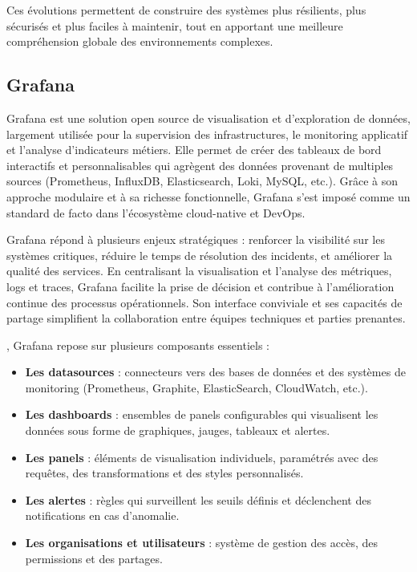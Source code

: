 Ces évolutions permettent de construire des systèmes plus résilients, plus sécurisés et plus faciles à maintenir, tout en apportant une meilleure compréhension globale des environnements complexes.

\subsection{Grafana}

Grafana est une solution open source de visualisation et d’exploration de données, largement utilisée pour la supervision des infrastructures, le monitoring applicatif et l’analyse d’indicateurs métiers. Elle permet de créer des tableaux de bord interactifs et personnalisables qui agrègent des données provenant de multiples sources (Prometheus, InfluxDB, Elasticsearch, Loki, MySQL, etc.). Grâce à son approche modulaire et à sa richesse fonctionnelle, Grafana s’est imposé comme un standard de facto dans l’écosystème cloud-native et DevOps.

Grafana répond à plusieurs enjeux stratégiques  : renforcer la visibilité sur les systèmes critiques, réduire le temps de résolution des incidents, et améliorer la qualité des services. En centralisant la visualisation et l’analyse des métriques, logs et traces, Grafana facilite la prise de décision et contribue à l’amélioration continue des processus opérationnels. Son interface conviviale et ses capacités de partage simplifient la collaboration entre équipes techniques et parties prenantes.

, Grafana repose sur plusieurs composants essentiels  :
\begin{itemize}
	\item \textbf{Les datasources}  : connecteurs vers des bases de données et des systèmes de monitoring (Prometheus, Graphite, ElasticSearch, CloudWatch, etc.).
	\item \textbf{Les dashboards}  : ensembles de panels configurables qui visualisent les données sous forme de graphiques, jauges, tableaux et alertes.
	\item \textbf{Les panels}  : éléments de visualisation individuels, paramétrés avec des requêtes, des transformations et des styles personnalisés.
	\item \textbf{Les alertes}  : règles qui surveillent les seuils définis et déclenchent des notifications en cas d’anomalie.
	\item \textbf{Les organisations et utilisateurs}  : système de gestion des accès, des permissions et des partages.
\end{itemize}

